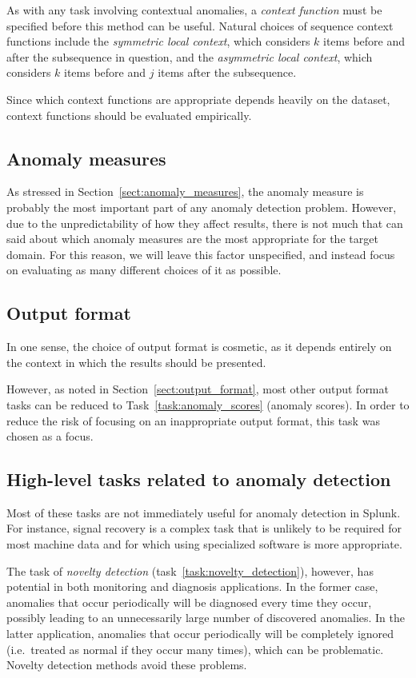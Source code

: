 As with any task involving contextual anomalies, a \emph{context function} must be specified before this method can be useful. Natural choices of sequence context functions include the \emph{symmetric local context}, which considers $k$ items before and after the subsequence in question, and the \emph{asymmetric local context}, which considers $k$ items before and $j$ items after the subsequence.

Since which context functions are appropriate depends heavily on the dataset, context functions should be evaluated empirically.

\subsection{Anomaly measures}

As stressed in Section~\ref{sect:anomaly_measures}, the anomaly measure is probably the most important part of any anomaly detection problem. However, due to the unpredictability of how they affect results, there is not much that can said about which anomaly measures are the most appropriate for the target domain. For this reason, we will leave this factor unspecified, and instead focus on evaluating as many different choices of it as possible.

\subsection{Output format}

In one sense, the choice of output format is cosmetic, as it depends entirely on the context in which the results should be presented. 

However, as noted in Section~\ref{sect:output_format}, most other output format tasks can be reduced to Task~\ref{task:anomaly_scores} (anomaly scores). In order to reduce the risk of focusing on an inappropriate output format, this task was chosen as a focus.

\subsection{High-level tasks related to anomaly detection}

Most of these tasks are not immediately useful for anomaly detection in Splunk. For instance, signal recovery is a complex task that is unlikely to be required for most machine data and for which using specialized software is more appropriate.

The task of \emph{novelty detection} (task~\ref{task:novelty_detection}), however, has potential in both monitoring and diagnosis applications. In the former case, anomalies that occur periodically will be diagnosed every time they occur, possibly leading to an unnecessarily large number of discovered anomalies. In the latter application, anomalies that occur periodically will be completely ignored (i.e.\ treated as normal if they occur many times), which can be problematic. Novelty detection methods avoid these problems.

